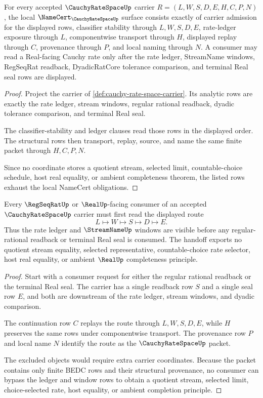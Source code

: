 \begin{theorem}
\label{thm:cauchy-rate-space-namecert-obligations}
For every accepted $\CauchyRateSpaceUp$ carrier $R=(L,W,S,D,E,H,C,P,N)$, the local $\NameCert_{\CauchyRateSpaceUp}$ surface consists exactly of carrier admission for the displayed rows, classifier stability through $L,W,S,D,E$, rate-ledger exposure through $L$, componentwise transport through $H$, displayed replay through $C$, provenance through $P$, and local naming through $N$. A consumer may read a Real-facing Cauchy rate only after the rate ledger, StreamName windows, RegSeqRat readback, DyadicRatCore tolerance comparison, and terminal Real seal rows are displayed.
\end{theorem}
\begin{proof}
Project the carrier of \autoref{def:cauchy-rate-space-carrier}. Its analytic rows are exactly the rate ledger, stream windows, regular rational readback, dyadic tolerance comparison, and terminal Real seal.

The classifier-stability and ledger clauses read those rows in the displayed order. The structural rows then transport, replay, source, and name the same finite packet through $H,C,P,N$.

Since no coordinate stores a quotient stream, selected limit, countable-choice schedule, host real equality, or ambient completeness theorem, the listed rows exhaust the local NameCert obligations.
\end{proof}

\begin{theorem}
\label{thm:cauchy-rate-space-regularization-handoff}
Every $\RegSeqRatUp$ or $\RealUp$-facing consumer of an accepted $\CauchyRateSpaceUp$ carrier must first read the displayed route
$$
L \longmapsto W \longmapsto S \longmapsto D \longmapsto E.
$$
Thus the rate ledger and $\StreamNameUp$ windows are visible before any regular-rational readback or terminal Real seal is consumed. The handoff exports no quotient stream equality, selected representative, countable-choice rate selector, host real equality, or ambient $\RealUp$ completeness principle.
\end{theorem}
\begin{proof}
Start with a consumer request for either the regular rational readback or the terminal Real seal. The carrier has a single readback row $S$ and a single seal row $E$, and both are downstream of the rate ledger, stream windows, and dyadic comparison.

The continuation row $C$ replays the route through $L,W,S,D,E$, while $H$ preserves the same rows under componentwise transport. The provenance row $P$ and local name $N$ identify the route as the $\CauchyRateSpaceUp$ packet.

The excluded objects would require extra carrier coordinates. Because the packet contains only finite BEDC rows and their structural provenance, no consumer can bypass the ledger and window rows to obtain a quotient stream, selected limit, choice-selected rate, host equality, or ambient completion principle.
\end{proof}

